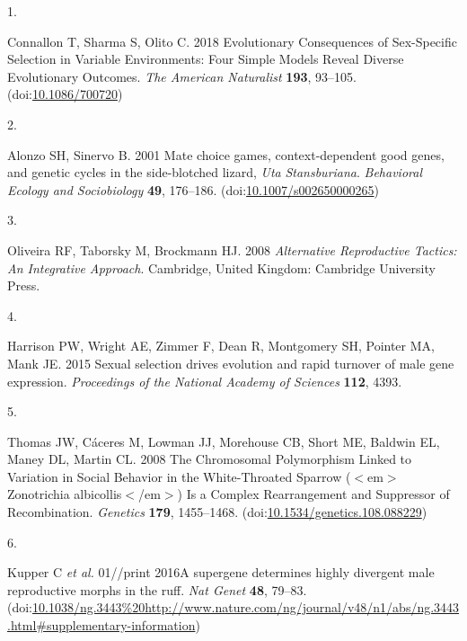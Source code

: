 \documentclass[
  11pt,
]{article}
\newlength{\cslhangindent}
\newlength{\csllabelwidth}
\newlength{\cslentryspacingunit} %
\newenvironment{CSLReferences}[2] %
 {%
  \setlength{\parindent}{0pt}
  \ifodd #1
  \let\oldpar\par
  \def\par{\hangindent=\cslhangindent\oldpar}
  \fi
  \setlength{\parskip}{#2\cslentryspacingunit}
 }%
 {}
\newcommand{\CSLLeftMargin}[1]{\parbox[t]{\csllabelwidth}{#1}}
\newcommand{\CSLRightInline}[1]{\parbox[t]{\linewidth - \csllabelwidth}{#1}\break}
\begin{document}
\hypertarget{refs}{}
\begin{CSLReferences}{0}{0}
\leavevmode{}%
\CSLLeftMargin{1. }
\CSLRightInline{Connallon T, Sharma S, Olito C. 2018 Evolutionary {Consequences} of {Sex-Specific Selection} in {Variable Environments}: {Four Simple Models Reveal Diverse Evolutionary Outcomes}. \emph{The American Naturalist} \textbf{193}, 93--105. (doi:\href{https://doi.org/10.1086/700720}{10.1086/700720})}

\leavevmode{}%
\CSLLeftMargin{2. }
\CSLRightInline{Alonzo SH, Sinervo B. 2001 Mate choice games, context-dependent good genes, and genetic cycles in the side-blotched lizard, {\emph{Uta}}{ \emph{Stansburiana}}. \emph{Behavioral Ecology and Sociobiology} \textbf{49}, 176--186. (doi:\href{https://doi.org/10.1007/s002650000265}{10.1007/s002650000265})}

\leavevmode{}%
\CSLLeftMargin{3. }
\CSLRightInline{Oliveira RF, Taborsky M, Brockmann HJ. 2008 \emph{Alternative {Reproductive Tactics}: {An Integrative Approach}}. {Cambridge, United Kingdom}: {Cambridge University Press}. }

\leavevmode{}%
\CSLLeftMargin{4. }
\CSLRightInline{Harrison PW, Wright AE, Zimmer F, Dean R, Montgomery SH, Pointer MA, Mank JE. 2015 Sexual selection drives evolution and rapid turnover of male gene expression. \emph{Proceedings of the National Academy of Sciences} \textbf{112}, 4393.}

\leavevmode{}%
\CSLLeftMargin{5. }
\CSLRightInline{Thomas JW, Cáceres M, Lowman JJ, Morehouse CB, Short ME, Baldwin EL, Maney DL, Martin CL. 2008 The {Chromosomal Polymorphism Linked} to {Variation} in {Social Behavior} in the {White-Throated Sparrow} ({\(<\)}em{\(>\)}{Zonotrichia} albicollis{\(<\)}/em{\(>\)}) {Is} a {Complex Rearrangement} and {Suppressor} of {Recombination}. \emph{Genetics} \textbf{179}, 1455--1468. (doi:\href{https://doi.org/10.1534/genetics.108.088229}{10.1534/genetics.108.088229})}

\leavevmode{}%
\CSLLeftMargin{6. }
\CSLRightInline{Kupper C \emph{et al.} 01//print 2016A supergene determines highly divergent male reproductive morphs in the ruff. \emph{Nat Genet} \textbf{48}, 79--83. (doi:\url{10.1038/ng.3443\%20http://www.nature.com/ng/journal/v48/n1/abs/ng.3443.html\#supplementary-information})}


\end{CSLReferences}
\end{document}
